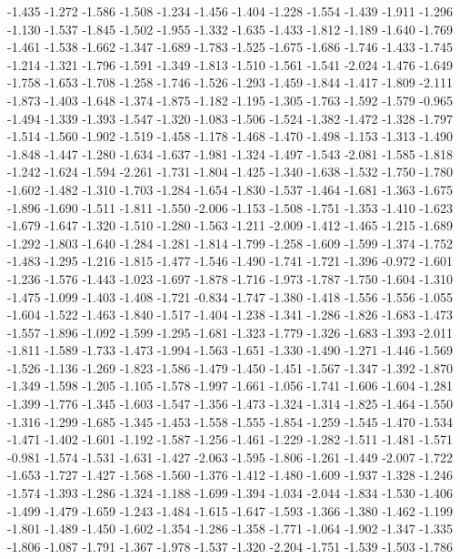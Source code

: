 \documentclass[9pt]{article}
\theoremstyle{plain}
\theoremstyle{definition}
\theoremstyle{remark}
\numberwithin{equation}{section}
\begin{document}
-1.435
-1.272
-1.586
-1.508
-1.234
-1.456
-1.404
-1.228
-1.554
-1.439
-1.911
-1.296
-1.130
-1.537
-1.845
-1.502
-1.955
-1.332
-1.635
-1.433
-1.812
-1.189
-1.640
-1.769
-1.461
-1.538
-1.662
-1.347
-1.689
-1.783
-1.525
-1.675
-1.686
-1.746
-1.433
-1.745
-1.214
-1.321
-1.796
-1.591
-1.349
-1.813
-1.510
-1.561
-1.541
-2.024
-1.476
-1.649
-1.758
-1.653
-1.708
-1.258
-1.746
-1.526
-1.293
-1.459
-1.844
-1.417
-1.809
-2.111
-1.873
-1.403
-1.648
-1.374
-1.875
-1.182
-1.195
-1.305
-1.763
-1.592
-1.579
-0.965
-1.494
-1.339
-1.393
-1.547
-1.320
-1.083
-1.506
-1.524
-1.382
-1.472
-1.328
-1.797
-1.514
-1.560
-1.902
-1.519
-1.458
-1.178
-1.468
-1.470
-1.498
-1.153
-1.313
-1.490
-1.848
-1.447
-1.280
-1.634
-1.637
-1.981
-1.324
-1.497
-1.543
-2.081
-1.585
-1.818
-1.242
-1.624
-1.594
-2.261
-1.731
-1.804
-1.425
-1.340
-1.638
-1.532
-1.750
-1.780
-1.602
-1.482
-1.310
-1.703
-1.284
-1.654
-1.830
-1.537
-1.464
-1.681
-1.363
-1.675
-1.896
-1.690
-1.511
-1.811
-1.550
-2.006
-1.153
-1.508
-1.751
-1.353
-1.410
-1.623
-1.679
-1.647
-1.320
-1.510
-1.280
-1.563
-1.211
-2.009
-1.412
-1.465
-1.215
-1.689
-1.292
-1.803
-1.640
-1.284
-1.281
-1.814
-1.799
-1.258
-1.609
-1.599
-1.374
-1.752
-1.483
-1.295
-1.216
-1.815
-1.477
-1.546
-1.490
-1.741
-1.721
-1.396
-0.972
-1.601
-1.236
-1.576
-1.443
-1.023
-1.697
-1.878
-1.716
-1.973
-1.787
-1.750
-1.604
-1.310
-1.475
-1.099
-1.403
-1.408
-1.721
-0.834
-1.747
-1.380
-1.418
-1.556
-1.556
-1.055
-1.604
-1.522
-1.463
-1.840
-1.517
-1.404
-1.238
-1.341
-1.286
-1.826
-1.683
-1.473
-1.557
-1.896
-1.092
-1.599
-1.295
-1.681
-1.323
-1.779
-1.326
-1.683
-1.393
-2.011
-1.811
-1.589
-1.733
-1.473
-1.994
-1.563
-1.651
-1.330
-1.490
-1.271
-1.446
-1.569
-1.526
-1.136
-1.269
-1.823
-1.586
-1.479
-1.450
-1.451
-1.567
-1.347
-1.392
-1.870
-1.349
-1.598
-1.205
-1.105
-1.578
-1.997
-1.661
-1.056
-1.741
-1.606
-1.604
-1.281
-1.399
-1.776
-1.345
-1.603
-1.547
-1.356
-1.473
-1.324
-1.314
-1.825
-1.464
-1.550
-1.316
-1.299
-1.685
-1.345
-1.453
-1.558
-1.555
-1.854
-1.259
-1.545
-1.470
-1.534
-1.471
-1.402
-1.601
-1.192
-1.587
-1.256
-1.461
-1.229
-1.282
-1.511
-1.481
-1.571
-0.981
-1.574
-1.531
-1.631
-1.427
-2.063
-1.595
-1.806
-1.261
-1.449
-2.007
-1.722
-1.653
-1.727
-1.427
-1.568
-1.560
-1.376
-1.412
-1.480
-1.609
-1.937
-1.328
-1.246
-1.574
-1.393
-1.286
-1.324
-1.188
-1.699
-1.394
-1.034
-2.044
-1.834
-1.530
-1.406
-1.499
-1.479
-1.659
-1.243
-1.484
-1.615
-1.647
-1.593
-1.366
-1.380
-1.462
-1.199
-1.801
-1.489
-1.450
-1.602
-1.354
-1.286
-1.358
-1.771
-1.064
-1.902
-1.347
-1.335
-1.806
-1.087
-1.791
-1.367
-1.978
-1.537
-1.320
-2.204
-1.751
-1.539
-1.503
-1.786
\end{document}
